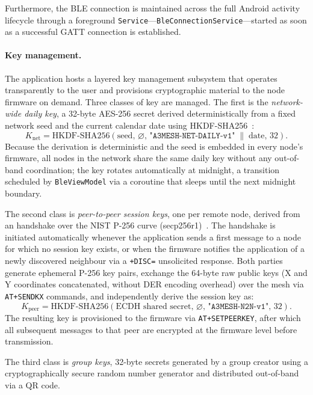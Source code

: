 \documentclass[english,bachelor]{tfgitic}[2026/01/22]
\begin{document}
Furthermore, the BLE connection is maintained across the full Android activity lifecycle through a foreground \texttt{Service}---\texttt{BleConnectionService}---started as soon as a successful GATT connection is established.

\paragraph{Key management.} The application hosts a layered key management subsystem that operates transparently to the user and provisions cryptographic material to the node firmware on demand. Three classes of key are managed. The first is the \emph{network-wide daily key}, a 32-byte AES-256 secret derived deterministically from a fixed network seed and the current calendar date using HKDF-SHA256~\cite{rfc5869}:
\begin{equation}
K_{\text{net}} = \text{HKDF-SHA256}\!\left(\text{seed},\,\varnothing,\,\texttt{"A3MESH-NET-DAILY-v1"} \;\|\; \text{date},\,32\right).
\end{equation}
Because the derivation is deterministic and the seed is embedded in every node's firmware, all nodes in the network share the same daily key without any out-of-band coordination; the key rotates automatically at midnight, a transition scheduled by \texttt{BleViewModel} via a coroutine that sleeps until the next midnight boundary.

The second class is \emph{peer-to-peer session keys}, one per remote node, derived from an  handshake over the NIST P-256 curve (secp256r1)~\cite{nist2018sp800_56a}. The handshake is initiated automatically whenever the application sends a first message to a node for which no session key exists, or when the firmware notifies the application of a newly discovered neighbour via a \texttt{+DISC=} unsolicited response. Both parties generate ephemeral P-256 key pairs, exchange the 64-byte raw public keys (X and Y coordinates concatenated, without DER encoding overhead) over the mesh via \texttt{AT+SENDKX} commands, and independently derive the session key as:
\begin{equation}
K_{\text{peer}} = \text{HKDF-SHA256}\!\left(\text{ECDH shared secret},\,\varnothing,\,\texttt{"A3MESH-N2N-v1"},\,32\right).
\end{equation}
The resulting key is provisioned to the firmware via \texttt{AT+SETPEERKEY}, after which all subsequent messages to that peer are encrypted at the firmware level before transmission. 

The third class is \emph{group keys}, 32-byte secrets generated by a group creator using a cryptographically secure random number generator and distributed out-of-band via a QR code. 
\end{document}
